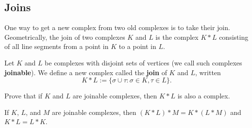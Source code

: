 \documentclass[12pt]{pset}
\newcommand{\defnword}[1]{\textbf{#1}}
\newcommand{\boundary}{\partial}
\newcommand{\join}{\ast}
\begin{document}






\subsection*{Joins}

One way to get a new complex from two old complexes is to take their
join.  Geometrically, the join of two complexes $K$ and $L$ is the
complex $K \join L$ consisting of all line segments from a point in
$K$ to a point in $L$.

\begin{definition*}
Let $K$ and $L$ be complexes with disjoint sets of vertices (we call
such complexes \defnword{joinable}).  We define a new complex called
the \defnword{join} of $K$ and $L$, written
$$
K \join L := \{ \sigma \cup \tau : \sigma \in K, \tau \in L \}.
$$
\end{definition*}

\begin{requiredproblem}
Prove that if $K$ and $L$ are joinable complexes, then $K \join L$ is
also a complex.
\end{requiredproblem}

\begin{problem}
If $K$, $L$, and $M$ are joinable complexes, then $(K \join
L) \join M = K \join (L \join M)$ and $K \join L = L \join K$.
\end{problem}
\end{document}
